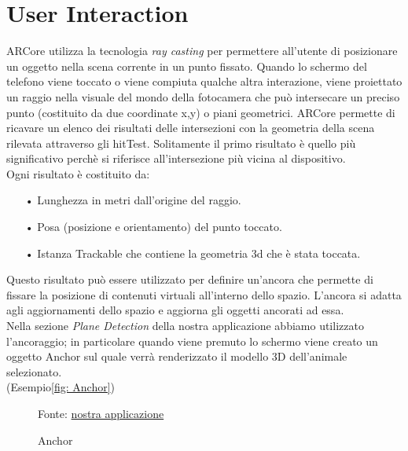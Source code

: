 \documentclass[crop=false, class=book]{standalone}
\begin{document}
	\chapter{User Interaction}
	ARCore utilizza la tecnologia \textit{ray casting} per permettere all'utente di posizionare un oggetto nella scena corrente 	in un punto fissato. Quando lo schermo del telefono viene toccato o viene compiuta qualche altra interazione, 					viene proiettato un raggio nella visuale del mondo della fotocamera che può intersecare un preciso punto (costituito da 		due coordinate x,y) o piani geometrici. ARCore permette di ricavare un elenco dei risultati delle intersezioni con la 			geometria della scena rilevata attraverso gli hitTest. Solitamente il primo risultato è quello più significativo 				perchè si riferisce all'intersezione più vicina al dispositivo.\\
	Ogni risultato è costituito da:
	
	\begin{itemize}
		\item[•] Lunghezza in metri dall'origine del raggio.
		\item[•] Posa (posizione e orientamento) del punto toccato.
		\item[•] Istanza Trackable che contiene la geometria 3d che è stata toccata.
	\end{itemize}
	
	\begin{flushleft}
	Questo risultato può essere utilizzato per definire un'ancora che permette di fissare la posizione di 							contenuti virtuali all'interno dello spazio. L'ancora si adatta agli aggiornamenti dello spazio e aggiorna gli oggetti 			ancorati ad essa.\\
	Nella sezione \emph{Plane Detection} della nostra applicazione abbiamo utilizzato l'ancoraggio; in particolare quando viene 	premuto lo schermo viene creato un oggetto Anchor sul quale verrà renderizzato il modello 3D dell'animale selezionato.\\
	(Esempio\vref{fig: Anchor})\\
	\end{flushleft}
	
	\begin{figure}
			\centering
			{Fonte: \url{nostra  applicazione}}
			\caption{Anchor}
			\label{fig: Anchor}
		\end{figure}
		
\end{document}
